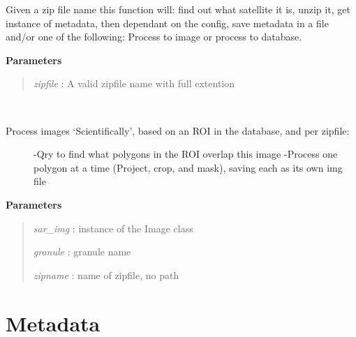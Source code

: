 \documentclass[letterpaper,10pt,openany,oneside]{sphinxmanual}
\begin{document}
\begin{fulllineitems}
\begin{fulllineitems}
\end{fulllineitems}


\begin{fulllineitems}
\label{code:SigLib.SigLib.retrieve}
Given a zip file name this function will: find out what satellite it is, unzip it, get instance of metadata, then 
dependant on the config, save metadata in a file and/or one of the following: Process to image or process to database.

\textbf{Parameters}
\begin{quote}

\emph{zipfile} : A valid zipfile name with full extention
\end{quote}

\end{fulllineitems}


\begin{fulllineitems}
\label{code:SigLib.SigLib.scientific}~\begin{description}
\item[{Process images `Scientifically', based on an ROI in the database, and per zipfile:}] \leavevmode
-Qry to find what polygons in the ROI overlap this image
-Process one polygon at a time (Project, crop, and mask), saving each as its own img file

\end{description}

\textbf{Parameters}
\begin{quote}

\emph{sar\_img} : instance of the Image class

\emph{granule} : granule name

\emph{zipname} : name of zipfile, no path
\end{quote}

\end{fulllineitems}


\end{fulllineitems}



\section{Metadata}
\label{code:metadata}
\end{document}
